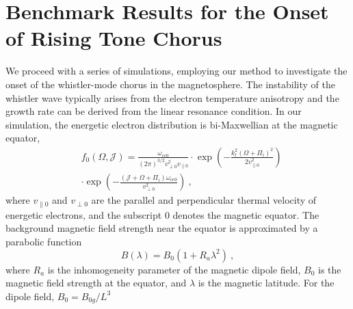 \section{Benchmark Results for the Onset of Rising Tone Chorus}
\label{sec:code}
We proceed with a series of simulations, employing our method to investigate the onset of the whistler-mode chorus
 in the  magnetosphere. The instability of the whistler wave typically arises from the electron temperature anisotropy  \cite{kennel1966a,kennel1966b} and the growth rate can be derived from the linear resonance condition.
In our simulation, the energetic electron distribution is bi-Maxwellian at the magnetic equator, 
\begin{equation}
    \begin{aligned}
        & f_{0}(\Omega, \mathcal{J}) =\frac{\omega_{c e 0}}{(2 \pi)^{3 / 2} v_{ \perp 0}^2 v_{ \| 0}} \cdot \exp \left(-\frac{k_l^2(\Omega+\Pi_i)^2}{2 v_{ \| 0}^2}\right) \\
        &\cdot\exp \left(-\frac{(\mathcal{J}+\Omega+\Pi_i) \omega_{c e 0}}{v_{ \perp 0}^2}\right)~,
        \end{aligned}
\end{equation}
where $v_{ \| 0}$
and $v_{ \perp 0}$ are the
parallel and perpendicular thermal velocity of energetic electrons,
and 
the subscript $0$ denotes the magnetic equator.
The background magnetic field strength near the equator is approximated %
 by a parabolic function \cite{tao2014a}
\begin{equation}
    B(\lambda) = B_0 (1+ R_a \lambda ^2)~,
\end{equation}
where $R_a$ is the inhomogeneity parameter of the magnetic dipole field, $B_0$ is the magnetic field strength at the equator, and $\lambda$ is the magnetic latitude. %
For the dipole field, 
 $   B_0 = B_{0g}/L^3$
